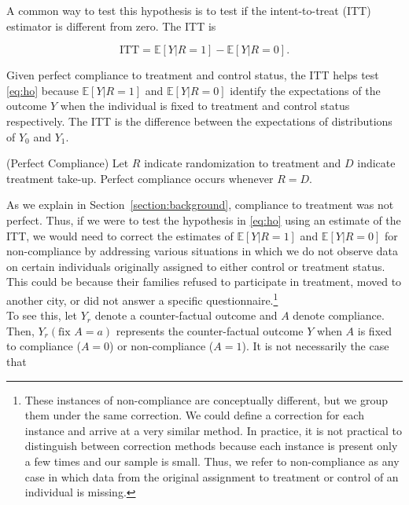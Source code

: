 \noindent A common way to test this hypothesis is to test if the intent-to-treat (ITT) estimator is different from zero. The ITT is 

\begin{equation}
\text{ITT} = \mathbb{E} \left[ Y | R = 1 \right] - \mathbb{E} \left[ Y | R = 0 \right]. \label{eq:itt}
\end{equation} 

\noindent Given perfect compliance to treatment and control status, the ITT helps test \eqref{eq:ho} because $\mathbb{E} \left[ Y | R = 1 \right]$ and $\mathbb{E} \left[ Y | R = 0 \right]$ identify the expectations of the outcome $Y$ when the individual is fixed to treatment and control status respectively. The ITT is the difference between the expectations of distributions of $Y_{0}$ and $Y_{1}$.

\noindent \begin{assumption} \normalfont (Perfect Compliance) Let $R$ indicate randomization to treatment and $D$ indicate treatment take-up. Perfect compliance occurs whenever  $R = D$.\end{assumption}

\noindent As we explain in Section~\ref{section:background}, compliance to treatment was not perfect. Thus, if we were to test the hypothesis in \eqref{eq:ho} using an estimate of the ITT, we would need to correct the estimates of $\mathbb{E} \left[ Y | R = 1 \right]$ and $\mathbb{E} \left[ Y | R = 0 \right]$ for non-compliance by addressing various situations in which we do not observe data on certain individuals originally assigned to either control or treatment status. This could be because their families refused to participate in treatment, moved to another city, or did not answer a specific questionnaire.\footnote{These instances of non-compliance are conceptually different, but we group them under the same correction. We could define a correction for each instance and arrive at a very similar method. In practice, it is not practical to distinguish between correction methods because each instance is present only a few times and our sample is small. Thus, we refer to non-compliance as any case in which data from the original assignment to treatment or control of an individual is missing.} \\

\noindent To see this, let $Y_r$ denote a counter-factual outcome and $A$ denote compliance. Then, $Y_{r} \left(\text{fix } A = a \right)$ represents the counter-factual outcome $Y$ when $A$ is fixed to compliance ($A = 0$) or non-compliance ($A = 1$). It is not necessarily the case that 

